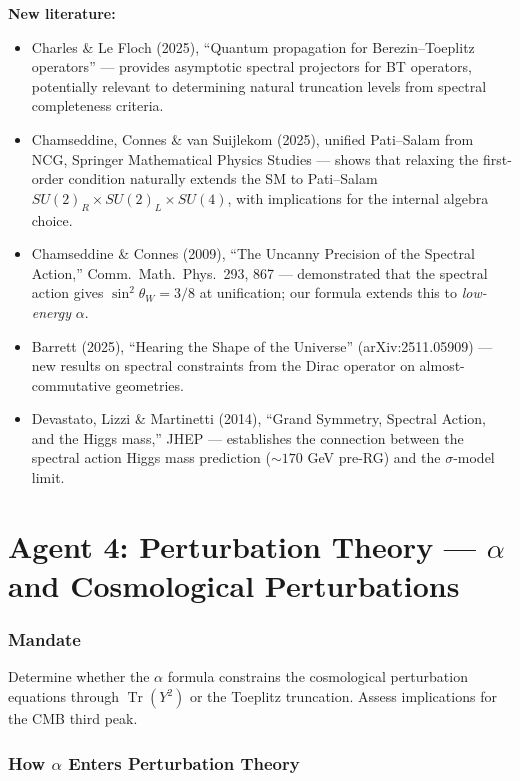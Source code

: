 \documentclass[11pt,a4paper]{article}
\newcommand{\Tr}{\operatorname{Tr}}
\begin{document}
\textbf{New literature:}
\begin{itemize}
\item Charles \& Le Floch (2025), ``Quantum propagation for Berezin--Toeplitz operators'' --- provides asymptotic spectral projectors for BT operators, potentially relevant to determining natural truncation levels from spectral completeness criteria.
\item Chamseddine, Connes \& van Suijlekom (2025), unified Pati--Salam from NCG, Springer Mathematical Physics Studies --- shows that relaxing the first-order condition naturally extends the SM to Pati--Salam $SU(2)_R \times SU(2)_L \times SU(4)$, with implications for the internal algebra choice.
\item Chamseddine \& Connes (2009), ``The Uncanny Precision of the Spectral Action,'' Comm.\ Math.\ Phys.\ 293, 867 --- demonstrated that the spectral action gives $\sin^2\theta_W = 3/8$ at unification; our formula extends this to \emph{low-energy} $\alpha$.
\item Barrett (2025), ``Hearing the Shape of the Universe'' (arXiv:2511.05909) --- new results on spectral constraints from the Dirac operator on almost-commutative geometries.
\item Devastato, Lizzi \& Martinetti (2014), ``Grand Symmetry, Spectral Action, and the Higgs mass,'' JHEP --- establishes the connection between the spectral action Higgs mass prediction ($\sim 170$ GeV pre-RG) and the $\sigma$-model limit.
\end{itemize}


\part{Agent 4: Perturbation Theory --- $\alpha$ and Cosmological Perturbations}
\label{part:agent4}

\section{Mandate}
Determine whether the $\alpha$ formula constrains the cosmological perturbation equations through $\Tr(Y^2)$ or the Toeplitz truncation. Assess implications for the CMB third peak.

\section{How $\alpha$ Enters Perturbation Theory}
\end{document}
